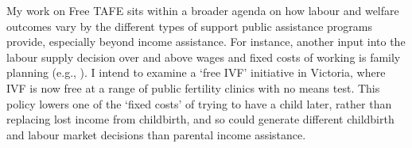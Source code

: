  My work on Free TAFE sits within a broader agenda on how labour and welfare outcomes vary by the different types of support public assistance programs provide, especially beyond income assistance. For instance, another input into the labour supply decision over and above wages and fixed costs of working is family planning (e.g., \cite{gallen2026}). I intend to examine a `free IVF' initiative in Victoria, where IVF is now free at a range of public fertility clinics with no means test. This policy lowers one of the `fixed costs' of trying to have a child later, rather than replacing lost income from childbirth, and so could generate different childbirth and labour market decisions than parental income assistance.
